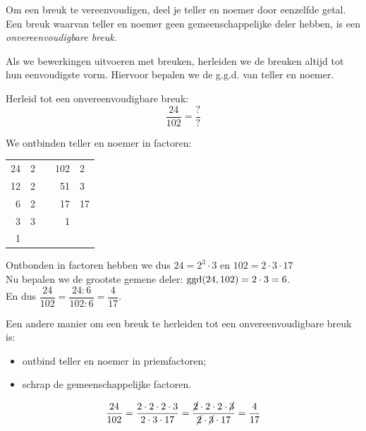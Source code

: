 \documentclass{bis}
\begin{document}
Om een breuk te vereenvoudigen, deel je teller en noemer door eenzelfde getal.
Een breuk waarvan teller en noemer geen gemeenschappelijke deler hebben, is een {\em onvereenvoudigbare breuk}. 

Als we bewerkingen uitvoeren met breuken, herleiden we de breuken altijd tot hun eenvoudigste vorm.
Hiervoor bepalen we de g.g.d. van teller en noemer.

\begin{voorbeeld}
Herleid tot een onvereenvoudigbare breuk:
\[\dfrac{24}{102}=\dfrac{?}{?}\]

We ontbinden teller en noemer in factoren:
\begin{center}
\begin{tabular}{r|lp{2cm}r|l}
24 & 2 & & 102 & 2\\
12 & 2 & &  51 & 3\\
6 & 2  & &  17 & 17\\
3 & 3  & &   1\\
1
\end{tabular}
\end{center}
Ontbonden in factoren hebben we dus $24=2^3\cdot 3$ en $102=2\cdot 3 \cdot 17$\\

Nu bepalen we de grootste gemene deler: $\ggd(24,102)=2\cdot 3=6$.\\

En dus $\dfrac{24}{102}=\dfrac{24:6}{102:6}=\dfrac{4}{17}$.

\end{voorbeeld}

Een andere manier om een breuk te herleiden tot een onvereenvoudigbare breuk is:
\begin{itemize}
  \item ontbind teller en noemer in priemfactoren;
  \item schrap de gemeenschappelijke factoren.
\end{itemize}

\begin{voorbeeld}
\[\dfrac{24}{102}=\dfrac{2\cdot 2\cdot 2\cdot 3}{2\cdot 3 \cdot 17}=\dfrac{\cancel{2}\cdot 2\cdot 2\cdot \cancel{3}}{\cancel{2}\cdot \cancel{3} \cdot 17}=\dfrac{4}{17}\]
\end{voorbeeld}
\end{document}
